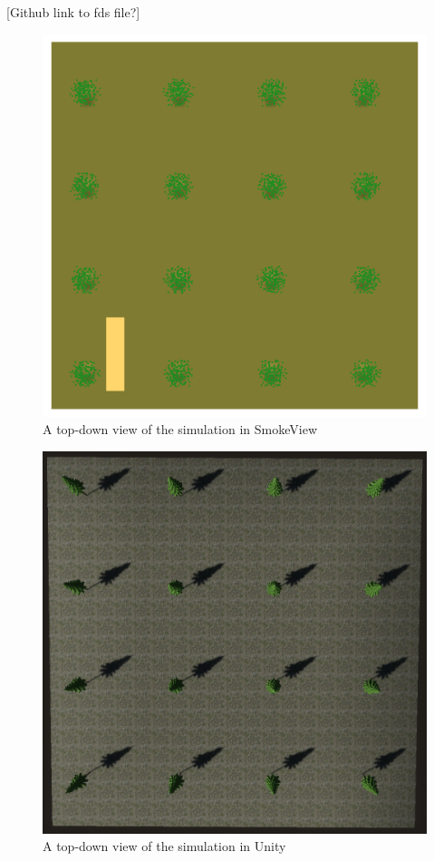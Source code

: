 \color{green}
[Github link to fds file?]\par
\color{black}
\begin{figure}
\centering
\includegraphics[scale=.3]{Figures/TopDownSMV.png}
\decoRule
\caption[Top Down SmokeView View]{A top-down view of the simulation in SmokeView }
\label{fig:CFDTopDownSmokeview}
\end{figure}
\begin{figure}
\centering
\includegraphics[scale=.3]{Figures/Topdown Unity.png}
\decoRule
\caption[Top Down Unity]{A top-down view of the simulation in Unity}
\label{fig:CFDTopDownUnity}
\end{figure}

